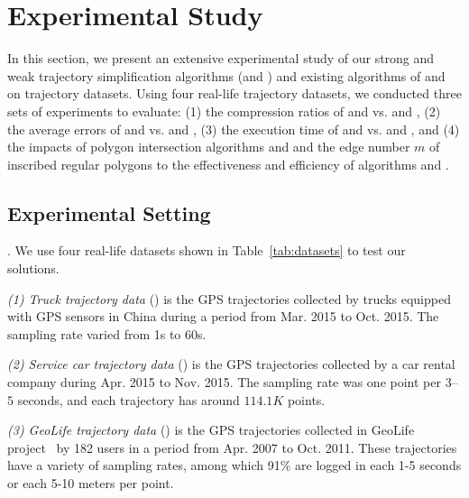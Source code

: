 \section{Experimental Study} %
\label{sec-exp}
In this section, we present an extensive experimental study of our strong and weak trajectory simplification algorithms (\cist and \cista) and existing algorithms of \dps and \squishe on trajectory datasets.
Using four real-life trajectory datasets, we conducted three sets of experiments to evaluate:
(1) the compression ratios of \cist and \cista vs. \dps and \squishe,
(2) the average errors of \cist and \cista vs. \dps and \squishe,
(3) the execution time of \cist and \cista vs. \dps and \squishe, and
(4) the impacts of polygon intersection algorithms \rpia and \cpia and the edge number $m$ of inscribed regular polygons to the effectiveness and efficiency of algorithms \cist and \cista.


\subsection{Experimental Setting}

.
We use four real-life datasets shown in Table~\ref{tab:datasets} to test our solutions.

\vspace{0.5ex}
\ni \emph{(1) Truck trajectory data} (\truck) is the GPS trajectories collected by  trucks equipped with GPS sensors in China
during a period from Mar. 2015 to Oct. 2015. The sampling rate varied from 1s to 60s.

\vspace{0.5ex}
\ni \emph{(2) Service car trajectory data} (\sercar) is the GPS trajectories collected by a car rental company during Apr. 2015 to Nov. 2015. The sampling rate was one point per $3$--$5$ seconds, and
each trajectory has around $114.1K$ points.

\vspace{0.5ex}
\ni \emph{(3) GeoLife trajectory data} (\geolife) is the GPS trajectories collected in GeoLife project~\cite{Zheng:GeoLife} by 182 users in a period from Apr. 2007 to Oct. 2011. These trajectories have a variety of sampling rates, among which 91\% are logged in each 1-5 seconds or each 5-10 meters per point.

